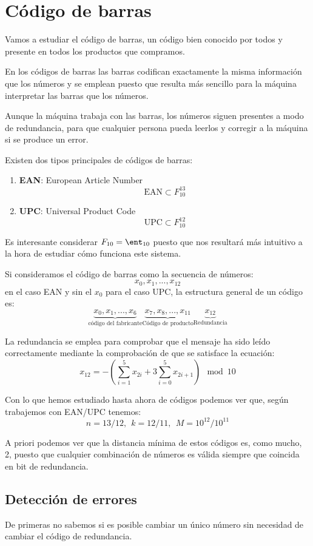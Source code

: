 \section{Código de barras}
Vamos a estudiar el código de barras, un código bien conocido por todos y presente en todos los productos que compramos.

En los códigos de barras las barras codifican exactamente la misma información que los números y se emplean puesto que resulta más sencillo para la máquina interpretar las barras que los números.

Aunque la máquina trabaja con las barras, los números siguen presentes a modo de redundancia, para que cualquier persona pueda leerlos y corregir a la máquina si se produce un error.

Existen dos tipos principales de códigos de barras:
\begin{enumerate}
\item \textbf{EAN}: European Article Number
\[\text{EAN} \subset F_{10}^{13}\]
\item \textbf{UPC}: Universal Product Code
\[\text{UPC} \subset F_{10}^{12}\]
\end{enumerate}

Es interesante considerar $F_{10} = \ent_{10}$ puesto que nos resultará más intuitivo a la hora de estudiar cómo funciona este sistema.

Si consideramos el código de barras como la secuencia de números:
\[x_0,x_1,...,x_{12}\]
en el caso EAN y sin el $x_0$ para el caso UPC, la estructura general de un código es:
\[\underbrace{x_0,x_1,...,x_6}_{\text{código del fabricante}}\underbrace{x_7,x_8,...,x_{11}}_{\text{Código de producto}}\underbrace{x_{12}}_{\text{Redundancia}}\]

La redundancia se emplea para comprobar que el mensaje ha sido leído correctamente mediante la comprobación de que se satisface la ecuación:
\[x_{12} = -\left(\sum_{i=1}^5x_{2i} + 3 \sum_{i=0}^5x_{2i+1} \right)\mod 10\]

Con lo que hemos estudiado hasta ahora de códigos podemos ver que, según trabajemos con EAN/UPC tenemos:
\[n=13/12, \ \ k=12/11, \ \ M = 10^{12}/10^{11}\]

A priori podemos ver que la distancia mínima de estos códigos es, como mucho, 2, puesto que cualquier combinación de números es válida siempre que coincida en bit de redundancia.

\subsection{Detección de errores}
De primeras no sabemos si es posible cambiar un único número sin necesidad de cambiar el código de redundancia.


